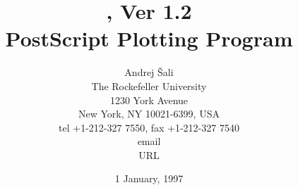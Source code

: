 \title{\vspace{3cm} \ASGL, Ver 1.2 \\[1cm]
       PostScript Plotting Program \\[3cm]}

\author{Andrej \v{S}ali \\[0.5cm]
The Rockefeller University  \\
1230 York Avenue \\
New York, NY 10021-6399, USA  \\
tel +1-212-327 7550, fax +1-212-327 7540  \\
email  \\
URL 
}

\date{1 January, 1997}
